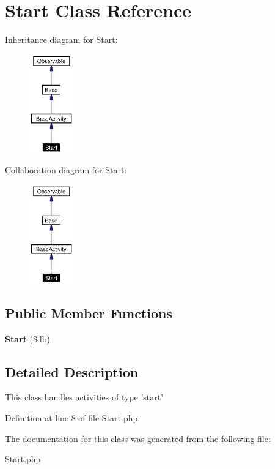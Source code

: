 \section{Start Class Reference}
\label{classStart}
Inheritance diagram for Start:\begin{figure}[H]
\begin{center}
\leavevmode
\includegraphics[width=54pt]{classStart__inherit__graph}
\end{center}
\end{figure}
Collaboration diagram for Start:\begin{figure}[H]
\begin{center}
\leavevmode
\includegraphics[width=54pt]{classStart__coll__graph}
\end{center}
\end{figure}
\subsection*{Public Member Functions}
\begin{CompactItemize}
\item 
{\bf Start} (\$db)\label{classStart_a0}

\end{CompactItemize}


\subsection{Detailed Description}
This class handles activities of type 'start' 



Definition at line 8 of file Start.php.

The documentation for this class was generated from the following file:\begin{CompactItemize}
\item 
Start.php\end{CompactItemize}
